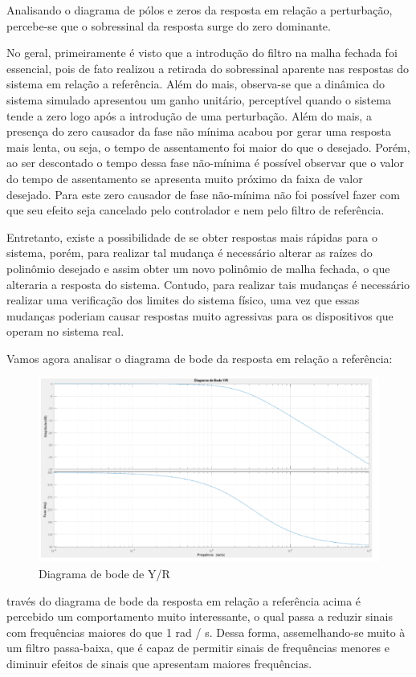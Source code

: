 \documentclass[a4paper,12pt]{report}
\begin{document}
Analisando o diagrama de pólos e zeros da resposta em relação a perturbação, percebe-se que o sobressinal da resposta surge do zero dominante.  


No geral, primeiramente é visto que a introdução do filtro na malha fechada foi essencial, pois de fato realizou a retirada do sobressinal aparente nas respostas do sistema em relação a referência. Além do mais, observa-se que a dinâmica do sistema simulado apresentou um ganho unitário, perceptível quando o sistema tende a zero logo após a introdução de uma perturbação. Além do mais, a presença do zero causador da fase não mínima acabou por gerar uma resposta mais lenta, ou seja, o tempo de assentamento foi maior do que o desejado. Porém, ao ser descontado o tempo dessa fase não-mínima é possível observar que o valor do tempo de assentamento se apresenta muito próximo da faixa de valor desejado. Para este zero causador de fase não-mínima não foi possível fazer com que seu efeito seja cancelado pelo controlador e nem pelo filtro de referência.   

Entretanto, existe a possibilidade de se obter respostas mais rápidas para o sistema, porém, para realizar tal mudança é necessário alterar as raízes do polinômio desejado e assim obter um novo polinômio de malha fechada, o que alteraria a resposta do sistema. Contudo, para realizar tais mudanças é necessário realizar uma verificação dos limites do sistema físico, uma vez que essas mudanças poderiam causar respostas muito agressivas para os dispositivos que operam no sistema real.  

Vamos agora analisar o diagrama de bode da resposta em relação a referência:

\begin{figure}[H]
    \centering
    \includegraphics[width=0.8\linewidth]{Imagens/bodey.png}
    \caption{Diagrama de bode de Y/R}
    \label{fig:enter-label}
\end{figure}

través do diagrama de bode da resposta em relação a referência acima é percebido um comportamento muito interessante, o qual passa a reduzir sinais com frequências maiores do que 1 rad / s. Dessa forma, assemelhando-se muito à um filtro passa-baixa, que é capaz de permitir sinais de frequências menores e diminuir efeitos de sinais que apresentam maiores frequências. 
\end{document}
